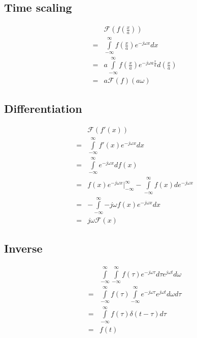 \documentclass{article}
\begin{document}
\subsection*{Time scaling}
\begin{eqnarray*}
  & & \mathcal{F}(f(\frac{x}{a})) \\
  &=& \int\limits_{-\infty}^{\infty}{f(\frac{x}{a})e^{-j \omega x}dx} \\
  &=& a\int\limits_{-\infty}^{\infty}{f(\frac{x}{a})e^{-j\omega a\frac{x}{a}}d(\frac{x}{a})} \\
  &=& a\mathcal{F}(f)(a\omega)
\end{eqnarray*}

\subsection*{Differentiation}
\begin{eqnarray*}
  & & \mathcal{F}(f'(x)) \\
  &=& \int\limits_{-\infty}^{\infty}{f'(x)e^{-j \omega x}dx} \\
  &=& \int\limits_{-\infty}^{\infty}{e^{-j \omega x}df(x)} \\
  &=& f(x)e^{-j \omega x}|_{-\infty}^{\infty} - \int\limits_{-\infty}^{\infty}{f(x)de^{-j \omega x}} \\
  &=&  - \int\limits_{-\infty}^{\infty}{-j \omega f(x)e^{-j \omega x}dx} \\
  &=&  j\omega \mathcal{F}(x)
\end{eqnarray*}

\subsection*{Inverse}
\begin{eqnarray*}
  & & \int\limits_{-\infty}^{\infty}{\int\limits_{-\infty}^{\infty}{f(\tau)e^{-j\omega \tau}d\tau}e^{j\omega t}d\omega} \\
  &=& \int\limits_{-\infty}^{\infty}{f(\tau)\int\limits_{-\infty}^{\infty}{e^{-j\omega \tau}e^{j\omega t}d\omega}d\tau} \\
  &=& \int\limits_{-\infty}^{\infty}{f(\tau)\delta(t - \tau)d\tau} \\
  &=& f(t)
\end{eqnarray*}
\end{document}
